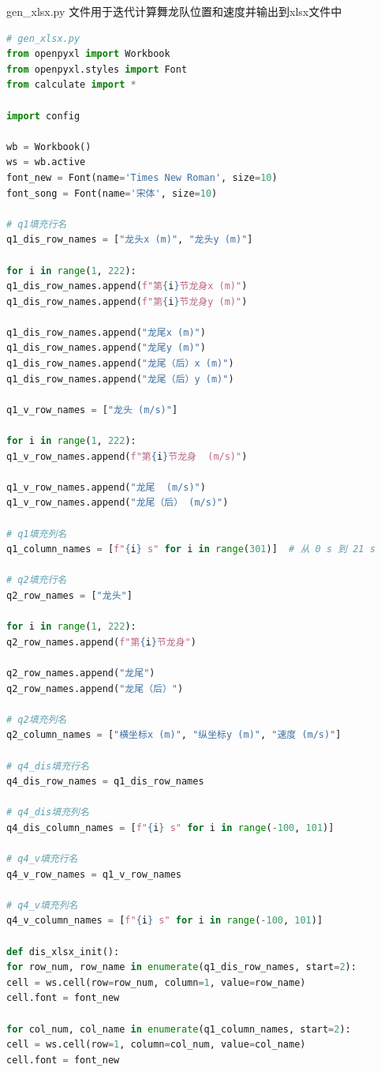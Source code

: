 \documentclass[a4paper]{article}
\begin{document}
 	gen\_xlsx.py 文件用于迭代计算舞龙队位置和速度并输出到xlsx文件中
	\begin{lstlisting}[language=python,columns=fullflexible,frame=shadowbox]
# gen_xlsx.py
from openpyxl import Workbook
from openpyxl.styles import Font
from calculate import *

import config

wb = Workbook()
ws = wb.active
font_new = Font(name='Times New Roman', size=10)
font_song = Font(name='宋体', size=10)

# q1填充行名
q1_dis_row_names = ["龙头x (m)", "龙头y (m)"]

for i in range(1, 222):
q1_dis_row_names.append(f"第{i}节龙身x (m)")
q1_dis_row_names.append(f"第{i}节龙身y (m)")

q1_dis_row_names.append("龙尾x (m)")
q1_dis_row_names.append("龙尾y (m)")
q1_dis_row_names.append("龙尾（后）x (m)")
q1_dis_row_names.append("龙尾（后）y (m)")

q1_v_row_names = ["龙头 (m/s)"]

for i in range(1, 222):
q1_v_row_names.append(f"第{i}节龙身  (m/s)")

q1_v_row_names.append("龙尾  (m/s)")
q1_v_row_names.append("龙尾（后） (m/s)")

# q1填充列名
q1_column_names = [f"{i} s" for i in range(301)]  # 从 0 s 到 21 s

# q2填充行名
q2_row_names = ["龙头"]

for i in range(1, 222):
q2_row_names.append(f"第{i}节龙身")

q2_row_names.append("龙尾")
q2_row_names.append("龙尾（后）")

# q2填充列名
q2_column_names = ["横坐标x (m)", "纵坐标y (m)", "速度 (m/s)"]

# q4_dis填充行名
q4_dis_row_names = q1_dis_row_names

# q4_dis填充列名
q4_dis_column_names = [f"{i} s" for i in range(-100, 101)]

# q4_v填充行名
q4_v_row_names = q1_v_row_names

# q4_v填充列名
q4_v_column_names = [f"{i} s" for i in range(-100, 101)]

def dis_xlsx_init():
for row_num, row_name in enumerate(q1_dis_row_names, start=2):
cell = ws.cell(row=row_num, column=1, value=row_name)
cell.font = font_new

for col_num, col_name in enumerate(q1_column_names, start=2):
cell = ws.cell(row=1, column=col_num, value=col_name)
cell.font = font_new



\end{lstlisting}
\end{document}
